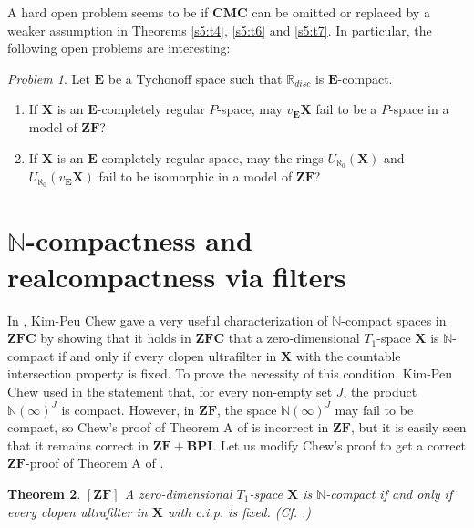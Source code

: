 \documentclass[12pt,twoside,leqno]{article}
\theoremstyle{plain}
\newtheorem{theorem}{Theorem}[section]
\theoremstyle{definition}
\theoremstyle{remark}
\newtheorem{problem}[theorem]{Problem}
\begin{document}
A hard open problem seems to be if $\mathbf{CMC}$ can be omitted or replaced by a weaker assumption in Theorems \ref{s5:t4}, \ref{s5:t6} and \ref{s5:t7}. In particular, the following open problems are interesting:

\begin{problem}
	\label{s5:q8} 
	Let $\mathbf{E}$ be a Tychonoff space such that $\mathbb{R}_{disc}$ is $\mathbf{E}$-compact. 

\begin{enumerate}
	\item[(i)]  If $\mathbf{X}$ is an $\mathbf{E}$-completely regular $P$-space, may $v_{\mathbf{E}}\mathbf{X}$ fail to be a $P$-space in a model of $\mathbf{ZF}$?
	\item[(ii)] If $\mathbf{X}$ is an  $\mathbf{E}$-completely regular space, may the rings $U_{\aleph_0}(\mathbf{X})$ and $U_{\aleph_0}(v_{\mathbf{E}}\mathbf{X})$ fail to be isomorphic in a model of $\mathbf{ZF}$?
\end{enumerate}
\end{problem}
\section{$\mathbb{N}$-compactness and realcompactness via filters}
\label{s6}

In \cite[Theorem A]{Chew}, Kim-Peu Chew gave a very useful characterization of $\mathbb{N}$-compact spaces in $\mathbf{ZFC}$ by showing that it holds in $\mathbf{ZFC}$ that a zero-dimensional $T_1$-space $\mathbf{X}$ is $\mathbb{N}$-compact if and only if every clopen ultrafilter in $\mathbf{X}$ with the countable intersection property is fixed. To prove the necessity of this condition,  Kim-Peu Chew used in \cite{Chew} the statement that, for every non-empty set $J$, the product $\mathbb{N}(\infty)^J$ is compact. However, in $\mathbf{ZF}$, the space  $\mathbb{N}(\infty)^J$ may fail to be compact, so Chew's proof of Theorem A of \cite{Chew} is incorrect in $\mathbf{ZF}$, but it is easily seen that it remains correct in $\mathbf{ZF+BPI}$. Let us modify Chew's proof to get a correct $\mathbf{ZF}$-proof of Theorem A of \cite{Chew}.

\begin{theorem}
	\label{s6:t1}
	$[\mathbf{ZF}]$ A zero-dimensional $T_1$-space $\mathbf{X}$ is $\mathbb{N}$-compact if and only if every clopen ultrafilter in $\mathbf{X}$ with c.i.p. is fixed. (Cf. \cite[Theorem A]{Chew}.)
\end{theorem}
\end{document}
